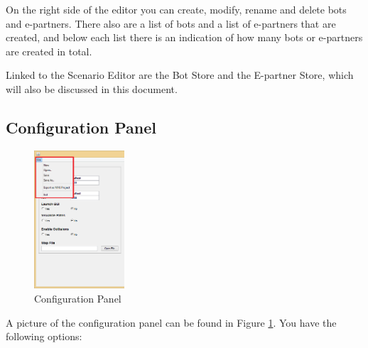 On the right side of the editor you can create, modify, rename and delete bots and e-partners. There also are a list of bots and a list of e-partners that are created, and below each list there is an indication of how many bots or e-partners are created in total.

Linked to the Scenario Editor are the Bot Store and the E-partner Store, which will also be discussed in this document.


\subsection{Configuration Panel}

\begin{figure}
 \begin{center}
	\includegraphics[width=0.3\textwidth]{ScenarioEditor/config.png}
 \end{center}
\caption{Configuration Panel}
\label{fig:ScenarioConfigPanel}
\end{figure}


A picture of the configuration panel can be found in Figure \ref{fig:ScenarioConfigPanel}. You have the following options:



